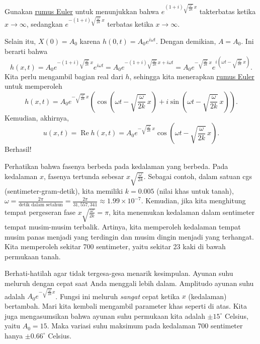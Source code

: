 \begin{exercise}
Gunakan \hyperref[eulersformula]{rumus Euler} untuk menunjukkan bahwa
$e^{(1+i)\sqrt{\frac{\omega}{2k}} \, x}$ takterbatas ketika $x \to \infty$,
sedangkan $e^{-(1+i)\sqrt{\frac{\omega}{2k}} \, x}$ terbatas
ketika $x \to \infty$.
\end{exercise}

Selain itu, $X(0) = A_0$ karena $h(0,t) = A_0 e^{i \omega t}$.
Dengan demikian, $A=A_0$.  Ini berarti bahwa
\begin{equation*}
h(x,t) = A_0 e^{-(1+i)\sqrt{\frac{\omega}{2k}} \, x} e^{i \omega t}
=
A_0 e^{-(1+i)\sqrt{\frac{\omega}{2k}} \, x + i \omega t}
=
A_0 e^{-\sqrt{\frac{\omega}{2k}} \, x}
e^{i(\omega t - \sqrt{\frac{\omega}{2k}} \, x)} .
\end{equation*}
Kita perlu mengambil bagian real dari $h$, sehingga
kita menerapkan \hyperref[eulersformula]{rumus Euler} untuk memperoleh
\begin{equation*}
h(x,t) =
A_0 e^{-\sqrt{\frac{\omega}{2k}} \, x}
\left(\cos \left(\omega t - \sqrt{\frac{\omega}{2k}}\, x\right) + 
i \sin \left(\omega t - \sqrt{\frac{\omega}{2k}}\, x\right) \right) .
\end{equation*}
Kemudian, akhirnya,
\begin{equation*}
u(x,t) = \operatorname{Re} h(x,t) =
A_0 e^{-\sqrt{\frac{\omega}{2k}}\, x}
\cos \left(\omega t - \sqrt{\frac{\omega}{2k}}\, x\right) .
\end{equation*}
Berhasil!

Perhatikan bahwa fasenya berbeda pada kedalaman yang berbeda.  Pada kedalaman $x$,
fasenya tertunda sebesar $x \sqrt{\frac{\omega}{2k}}$.
Sebagai contoh, dalam satuan cgs (sentimeter-gram-detik),
kita memiliki $k=0.005$ (nilai khas untuk tanah),
$\omega = \frac{2\pi}{\text{detik dalam setahun}}
= \frac{2\pi}{31,557,341} \approx 1.99 \times {10}^{-7}$.   Kemudian,
jika kita menghitung tempat pergeseran fase $x \sqrt{\frac{\omega}{2k}} = \pi$,
kita menemukan kedalaman dalam sentimeter tempat musim-musim terbalik.  Artinya,
kita memperoleh kedalaman tempat musim panas menjadi yang terdingin dan musim dingin menjadi yang terhangat.
Kita memperoleh
sekitar 700 sentimeter, yaitu sekitar 23 kaki di bawah permukaan tanah.

Berhati-hatilah agar tidak tergesa-gesa menarik kesimpulan.  Ayunan suhu meluruh dengan cepat saat Anda menggali lebih dalam.  Amplitudo
ayunan suhu adalah
$A_0 e^{-\sqrt{\frac{\omega}{2k}} x}$.  Fungsi ini meluruh \emph{sangat}
cepat ketika $x$ (kedalaman) bertambah.
Mari kita kembali mengambil
parameter khas seperti di atas.  Kita juga mengasumsikan bahwa
ayunan suhu permukaan kita adalah $\pm {15}^\circ$ Celsius, yaitu
$A_0 = 15$.  Maka variasi suhu maksimum pada kedalaman 700 sentimeter
hanya $\pm {0.66}^\circ$ Celsius.

